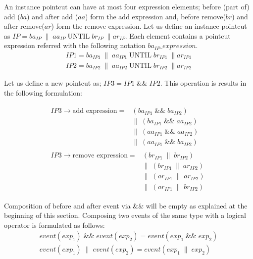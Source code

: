 \documentclass{llncs}
\begin{document}
An instance pointcut can have at most four expression elements; before (part of) add ($ba$) and after add ($aa$) form the add expression and, before remove($br$) and after remove($ar$) form the remove expression. Let us define an instance pointcut as $IP = ba_{IP}\;\|\;aa_{IP}\;\textrm{UNTIL}\;br_{IP}\;\| ar_{IP}$. Each element contains a pointcut expression referred with the following notation $ba_{IP}\_expression$. 
\begin{align}
	IP1 = ba_{IP1}\;\|\;aa_{IP1}\;\textrm{UNTIL}\;br_{IP1}\;\| ar_{IP1} 
\label{i1}	\\
	IP2 = ba_{IP2}\;\|\;aa_{IP2}\;\textrm{UNTIL}\;br_{IP2}\;\| ar_{IP2}
\label{i2}
\end{align}

Let us define a new pointcut as; $IP3 = IP1\;\textrm{\&\&}\;IP2$. This operation is results in the following formulation:

\begin{align}
\begin{split}
IP3 \rightarrow \textrm{add expression} =& \left( ba_{IP1}\;\textrm{\&\&}\;ba_{IP2}\right)\;\\ 
							&\|\;\left( ba_{IP1}\;\textrm{\&\&}\;aa_{IP2} \right)\;\\
&\|\;\left( aa_{IP1}\;\textrm{\&\&}\;aa_{IP2} \right)\;\\
&\|\;\left( aa_{IP1}\;\textrm{\&\&}\;ba_{IP2} \right) 
\label{i3add}
\end{split}
\\
\begin{split}
IP3 \rightarrow \textrm{remove expression}  =& \left( br_{IP1}\;\|\;br_{IP2}\right)\; \\
&\|\;\left( br_{IP1}\;\|\;ar_{IP2} \right)\;\\
&\|\;\left( ar_{IP1}\;\|\;ar_{IP2} \right)\;\\
&\|\;\left( ar_{IP1}\;\|\;br_{IP2} \right) 
\label{i3remove}
\end{split}
\end{align}

Composition of before and after event via \&\& will be empty as explained at the beginning of this section. Composing two events of the same type with a logical operator is formulated as follows:
\begin{align*}
event(exp_1)\;\&\&\;event(exp_2) = event(exp_1\;\&\&\;exp_2) \\
event(exp_1)\;\|\;event(exp_2) = event(exp_1\;\|\;exp_2)
\end{align*}
\end{document}
